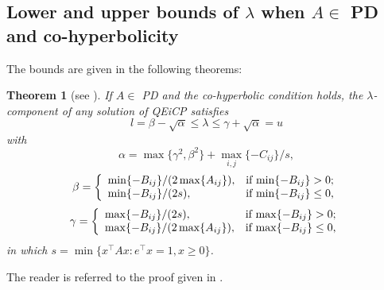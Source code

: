 \documentclass[3p]{elsarticle}
\newtheorem{thm}{Theorem}
\begin{document}
\subsection{Lower and upper bounds of $\lambda$ when $A\in$ PD and co-hyperbolicity}

The bounds are given in the following theorems:

\begin{thm}[see \cite{Niu15}]\label{thm:boundsoflambda}
	If $A\in$ PD and the co-hyperbolic condition holds, the $\lambda$-component of any solution of QEiCP satisfies
	\[l=\beta-\sqrt{\alpha} \leq \lambda \leq \gamma+\sqrt{\alpha}=u\]
	with $$\alpha = \max\{\gamma^2,\beta^2\} + \max_{i,j}\{-C_{ij}\}/s,$$
	\[\beta = \left\{\begin{array}{ll}
	\min\{-B_{ij}\}/(2\max\{A_{ij}\}), & \hbox{if $\min\{-B_{ij}\}>0$;} \\
	\min\{-B_{ij}\}/(2s), & \hbox{if $\min\{-B_{ij}\}\leq 0$,}
	\end{array}
	\right.\]
	\[\gamma=\left\{\begin{array}{ll}
	\max\{-B_{ij}\}/(2s), & \hbox{if $\max\{-B_{ij}\}>0$;} \\
	\max\{-B_{ij}\}/(2\max\{A_{ij}\}), & \hbox{if $\max\{-B_{ij}\}\leq0$,}
	\end{array}
	\right.\]
	in which $s=\min\{x^{\top}Ax: e^{\top}x=1, x\geq 0\}$. 
\end{thm}
\begin{pf}
	The reader is referred to the proof given in \cite{Niu15}.
\end{pf}
\end{document}
